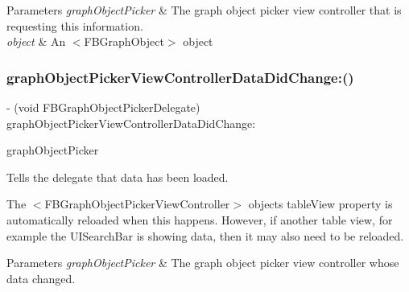 \begin{DoxyParams}{Parameters}
{\em graph\+Object\+Picker} & The graph object picker view controller that is requesting this information. \\
\hline
{\em object} & An $<$\+F\+B\+Graph\+Object$>$ object \\
\hline
\end{DoxyParams}
\mbox{\label{protocolFBGraphObjectPickerDelegate_01-p_a7444276f3c20567235206a1be36074cb}} 
\subsubsection{\texorpdfstring{graph\+Object\+Picker\+View\+Controller\+Data\+Did\+Change\+:()}{graphObjectPickerViewControllerDataDidChange:()}\hspace{0.1cm}{\footnotesize\ttfamily [1/5]}}
{\footnotesize\ttfamily -\/ (void F\+B\+Graph\+Object\+Picker\+Delegate) graph\+Object\+Picker\+View\+Controller\+Data\+Did\+Change\+: \begin{DoxyParamCaption}\item[{(\hyperlink{interfaceFBGraphObjectPickerViewController}{F\+B\+Graph\+Object\+Picker\+View\+Controller} $\ast$)}]{graph\+Object\+Picker }\end{DoxyParamCaption}\hspace{0.3cm}{\ttfamily [optional]}}

Tells the delegate that data has been loaded.

The $<$\+F\+B\+Graph\+Object\+Picker\+View\+Controller$>$ object\textquotesingle{}s {\ttfamily table\+View} property is automatically reloaded when this happens. However, if another table view, for example the {\ttfamily U\+I\+Search\+Bar} is showing data, then it may also need to be reloaded.


\begin{DoxyParams}{Parameters}
{\em graph\+Object\+Picker} & The graph object picker view controller whose data changed. \\
\hline
\end{DoxyParams}
\mbox{\label{protocolFBGraphObjectPickerDelegate_01-p_a7444276f3c20567235206a1be36074cb}} 
